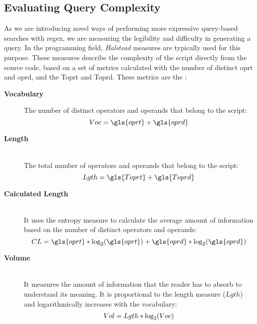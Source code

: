 \subsection{Evaluating Query Complexity}
\label{subsec:complex}

As we are introducing novel ways of performing more expressive query-based searches with \gls{regex}, we are measuring the legibility and difficulty in generating a query. In the programming field, \textit{Halstead} measures are typically used for this purpose. These measures describe the complexity of the script directly from the source code, based on a set of metrics calculated with the number of distinct \gls{oprt} and \gls{oprd}, and the \gls{Toprt} and \gls{Toprd}. These metrics are the \cite{Halstead2}:

\begin{description}
 	\item [\textbf{Vocabulary}] 
    	The number of distinct operators and operands that belong to the script:
        \begin{equation}
        \centering
        Voc = \gls{oprt} + \gls{oprd}
        \end{equation}
    
     \item [\textbf{Length}] \hfill \\
    	The total number of operators and operands that belong to the script:
        \begin{equation}
        	\centering
        	Lgth = \gls{Toprt} + \gls{Toprd}
        \end{equation}
        
     \item [\textbf{Calculated Length}] \hfill \\
    	It uses the entropy measure to calculate the average amount of information based on the number of distinct operators and operands:
        \begin{equation}
        	\centering
        	CL = \gls{oprt}*\log_2(\gls{oprt}) + \gls{oprd}*\log_2(\gls{oprd})
        \end{equation}
       
     \item [\textbf{Volume}] \hfill \\
    	It measures the amount of information that the reader has to absorb to understand its meaning. It is proportional to the length measure ($Lgth$) and logarithmically increases with the vocabulary:
        \begin{equation}
        	\centering
            Vol = Lgth*\log_2(Voc)
        \end{equation}
        

\end{description}
